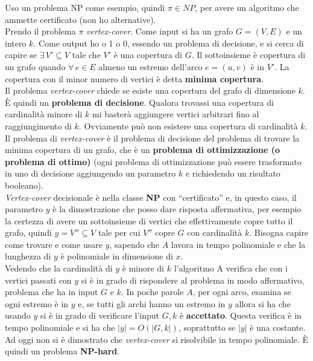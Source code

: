 \begin{esempio}
	Uso un problema NP come esempio, quindi $\pi\in NP$, per avere un algoritmo
	che ammette certificato (non ho alternative). \\
	Prendo il problema $\pi$ \emph{vertex-cover}. Come input si ha un grafo
	$G=(V,E)$ e un intero $k$. Come output ho o 1 o 0, essendo un problema di
	decisione, e si cerca di capire se $\exists\, V'\subseteq V$ tale che $V'$ è
	una copertura di $G$. Il sottoinsieme è copertura di un grafo quando
	$\forall\, e\in E$ almeno un estremo dell'arco $e=(u,v)$ è in $V'$. La
	copertura con il minor numero di vertici è detta \textbf{minima copertura}.\\
	Il problema \emph{vertex-cover} chiede se esiste una copertura del grafo di
	dimensione $k$. È quindi un \textbf{problema di decisione}. Qualora trovassi
	una copertura di cardinalità minore di $k$ mi basterà aggiungere vertici
	arbitrari fino al raggiungimento di $k$. Ovviamente può non esistere una
	copertura di cardinalità $k$.\\
	Il problema di \emph{vertex-cover} è il problema di decisione del problema di
	trovare la minima copertura di un grafo, che è un \textbf{problema di
	ottimizzazione (o problema di ottimo)} (ogni problema di ottimizzazione può
	essere trasformato in uno di decisione aggiungendo un parametro $k$ e
	richiedendo un risultato booleano).\\
	\emph{Vertex-cover} decisionale è nella classe \textbf{NP} con ``certificato''
	e, in questo caso, il parametro $y$ è la dimostrazione che posso dare risposta
	affermativa, per esempio la certezza di avere un sottoinsieme di vertici che
	effettivamente copre tutto il grafo, quindi $y=V''\subseteq V$ tale per cui
	$V''$ copre $G$ con cardinalità $k$. Bisogna capire come trovare e come usare
	$y$, sapendo che $A$ lavora in tempo polinomiale e che la lunghezza di $y$ è
	polinomiale in dimensione di $x$.\\ 
	Vedendo che la cardinalità di $y$ è minore di $k$ l'algoritmo A verifica che
	con i vertici passati con $y$ si è in grado di rispondere al problema in modo
	affermativo, problema che ha in input $G$ e $k$. In poche parole $A$, per ogni
	arco, esamina se ogni estremo è in $y$ e, se tutti gli archi hanno un estremo
	in $y$ allora si ha che usando $y$ si è in grado di verificare l'input $G,
	k$ è \textbf{accettato}. Questa verifica è in tempo polinomiale e si ha che
	$|y|=O(|G,k|)$, soprattutto se $|y|$ è una costante.\\
	Ad oggi non si è dimostrato che \emph{vertex-cover} si risolvibile in tempo
	polinomiale. È quindi un problema \textbf{NP-hard}.
\end{esempio}
